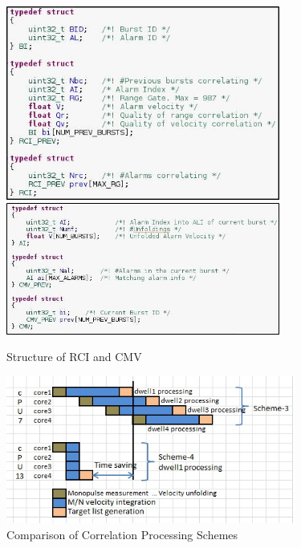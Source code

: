 \begin{figure}[h!]
	\centering
	\includegraphics[width=90mm]{figures/biv_struct1}
	\includegraphics[width=90mm]{figures/biv_struct2}
	\caption{Structure of RCI and CMV}
	\label{fig:mm:biv_struct}
\end{figure}


\begin{figure}[h!]
	\centering
	\includegraphics[width=95mm]{figures/scheme5_corr_dd}
	\caption{Comparison of Correlation Processing Schemes}
	\label{fig:mm:scheme5_corr_dd}
\end{figure}

